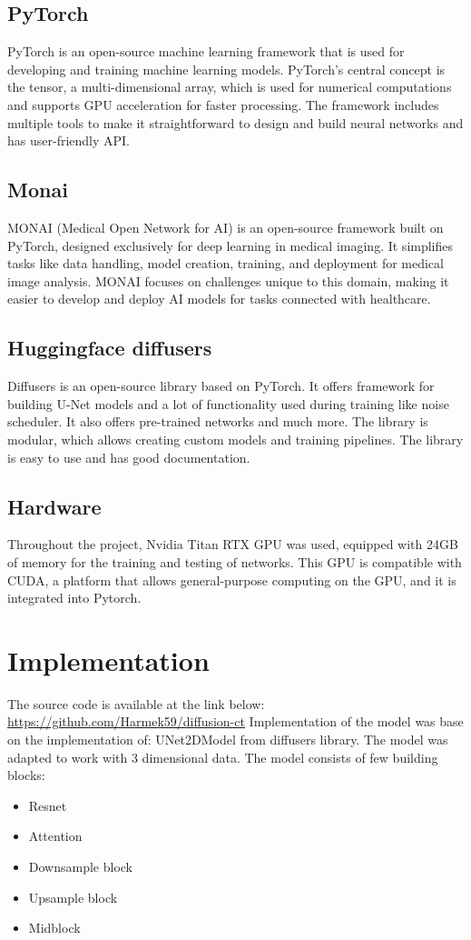 \documentclass[11pt,a4paper]{report}
\begin{document}
\subsection{PyTorch}
PyTorch is an open-source machine learning framework that is used for developing and training machine learning models. PyTorch's central concept is the tensor, a multi-dimensional array, which is used for numerical computations and supports GPU acceleration for faster processing. The framework includes multiple tools to make it straightforward to design and build neural networks and has user-friendly API. \cite{Pytorch}
\subsection{Monai}
MONAI (Medical Open Network for AI) is an open-source framework built on PyTorch, designed exclusively for deep learning in medical imaging. It simplifies tasks like data handling, model creation, training, and deployment for medical image analysis. MONAI focuses on challenges unique to this domain, making it easier to develop and deploy AI models for tasks connected with healthcare. \cite{Monai}
\subsection{Huggingface diffusers}
Diffusers is an open-source library based on PyTorch. It offers framework for building U-Net models and a lot of functionality used during training like noise scheduler. It also offers pre-trained networks and much more. The library is modular, which allows creating custom models and training pipelines. The library is easy to use and has good documentation. \cite{Hf_diffusers}
\subsection{Hardware}
Throughout the project, Nvidia Titan RTX GPU was used, equipped with 24GB of memory for the training and testing of networks. This GPU is compatible with CUDA, a platform that allows general-purpose computing on the GPU, and it is integrated into Pytorch.
\section{Implementation}
The source code is available at the link below:
\newline
\url{https://github.com/Harmek59/diffusion-ct}
\newline
Implementation of the model was base on the implementation of: UNet2DModel from diffusers library. The model was adapted to work with 3 dimensional data.
The model consists of few building blocks:
\begin{itemize}
\item Resnet
\item Attention
\item Downsample block
\item Upsample block
\item Midblock
\end{itemize}
\end{document}
